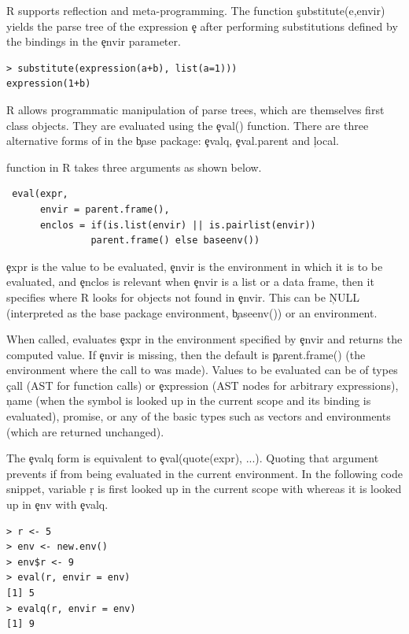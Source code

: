 \documentclass[conference]{IEEEtran}
\begin{document}
R supports reflection and meta-programming. The function \c{substitute(e,envir)}
yields the parse tree of the expression \c{e} after performing substitutions
defined by the bindings in the \c{envir} parameter.

\begin{lstlisting}
> substitute(expression(a+b), list(a=1)))  
expression(1+b)
\end{lstlisting}

\noindent
R allows programmatic manipulation of parse trees, which are themselves
first class objects. They are evaluated using the \c{eval()}
function. There are three alternative forms  of \eval in the \c{base} package:
\c{evalq}, \c{eval.parent} and \c{local}.

\eval function in R takes three arguments as shown below.
\begin{lstlisting}
 eval(expr,
      envir = parent.frame(),
      enclos = if(is.list(envir) || is.pairlist(envir))
               parent.frame() else baseenv())
\end{lstlisting}           

\c{expr} is the value to be evaluated, \c{envir}
is the environment in which it is to be evaluated, and \c{enclos} is
relevant when \c{envir} is a list or a data frame, then it specifies where R
looks for objects not found in \c{envir}. This can be \c{NULL} (interpreted
as the base package environment, \c{baseenv()}) or an environment.

When called, \eval evaluates \c{expr} in the environment specified by
\c{envir} and returns the computed value. If \c{envir} is missing, then the
default is \c{parent.frame()} (the environment where the call to \eval was
made).  Values to be evaluated can be of types \c{call} (AST for function
calls) or \c{expression} (AST nodes for arbitrary expressions), \c{name}
(when the symbol is looked up in the current scope and its binding is
evaluated), promise, or any of the basic types such as vectors and
environments (which are returned unchanged).

The \c{evalq} form is equivalent to \c{eval(quote(expr), ...)}.  Quoting
that argument prevents if from being evaluated in the current environment.
In the following code snippet, variable \c{r} is first looked up in
the current scope with \eval whereas it is looked up in \c{env} with
\c{evalq}.

\begin{lstlisting}
> r <- 5
> env <- new.env()
> env$r <- 9
> eval(r, envir = env)
[1] 5
> evalq(r, envir = env)
[1] 9
\end{lstlisting}
\end{document}
